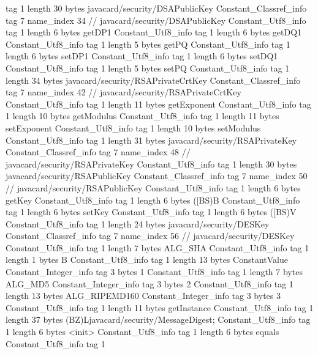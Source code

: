 {{{			tag	1
			length	30
			bytes	javacard/security/DSAPublicKey
		}
		Constant_Classref_info {
			tag	7
			name_index	34		// javacard/security/DSAPublicKey
		}
		Constant_Utf8_info {
			tag	1
			length	6
			bytes	getDP1
		}
		Constant_Utf8_info {
			tag	1
			length	6
			bytes	getDQ1
		}
		Constant_Utf8_info {
			tag	1
			length	5
			bytes	getPQ
		}
		Constant_Utf8_info {
			tag	1
			length	6
			bytes	setDP1
		}
		Constant_Utf8_info {
			tag	1
			length	6
			bytes	setDQ1
		}
		Constant_Utf8_info {
			tag	1
			length	5
			bytes	setPQ
		}
		Constant_Utf8_info {
			tag	1
			length	34
			bytes	javacard/security/RSAPrivateCrtKey
		}
		Constant_Classref_info {
			tag	7
			name_index	42		// javacard/security/RSAPrivateCrtKey
		}
		Constant_Utf8_info {
			tag	1
			length	11
			bytes	getExponent
		}
		Constant_Utf8_info {
			tag	1
			length	10
			bytes	getModulus
		}
		Constant_Utf8_info {
			tag	1
			length	11
			bytes	setExponent
		}
		Constant_Utf8_info {
			tag	1
			length	10
			bytes	setModulus
		}
		Constant_Utf8_info {
			tag	1
			length	31
			bytes	javacard/security/RSAPrivateKey
		}
		Constant_Classref_info {
			tag	7
			name_index	48		// javacard/security/RSAPrivateKey
		}
		Constant_Utf8_info {
			tag	1
			length	30
			bytes	javacard/security/RSAPublicKey
		}
		Constant_Classref_info {
			tag	7
			name_index	50		// javacard/security/RSAPublicKey
		}
		Constant_Utf8_info {
			tag	1
			length	6
			bytes	getKey
		}
		Constant_Utf8_info {
			tag	1
			length	6
			bytes	([BS)B
		}
		Constant_Utf8_info {
			tag	1
			length	6
			bytes	setKey
		}
		Constant_Utf8_info {
			tag	1
			length	6
			bytes	([BS)V
		}
		Constant_Utf8_info {
			tag	1
			length	24
			bytes	javacard/security/DESKey
		}
		Constant_Classref_info {
			tag	7
			name_index	56		// javacard/security/DESKey
		}
		Constant_Utf8_info {
			tag	1
			length	7
			bytes	ALG_SHA
		}
		Constant_Utf8_info {
			tag	1
			length	1
			bytes	B
		}
		Constant_Utf8_info {
			tag	1
			length	13
			bytes	ConstantValue
		}
		Constant_Integer_info {
			tag	3
			bytes	1
		}
		Constant_Utf8_info {
			tag	1
			length	7
			bytes	ALG_MD5
		}
		Constant_Integer_info {
			tag	3
			bytes	2
		}
		Constant_Utf8_info {
			tag	1
			length	13
			bytes	ALG_RIPEMD160
		}
		Constant_Integer_info {
			tag	3
			bytes	3
		}
		Constant_Utf8_info {
			tag	1
			length	11
			bytes	getInstance
		}
		Constant_Utf8_info {
			tag	1
			length	37
			bytes	(BZ)Ljavacard/security/MessageDigest;
		}
		Constant_Utf8_info {
			tag	1
			length	6
			bytes	<init>
		}
		Constant_Utf8_info {
			tag	1
			length	6
			bytes	equals
		}
		Constant_Utf8_info {
			tag	1
}}}
